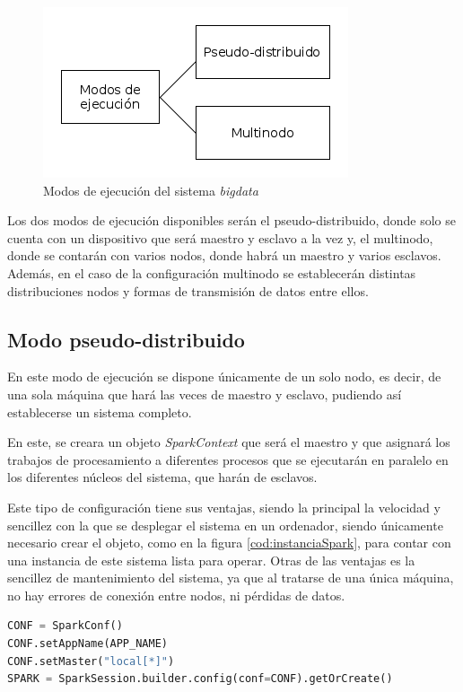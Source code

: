 \begin{figure}[htp!]
\centering
\caption{Modos de ejecución del sistema \textit{bigdata}}
\label{fig:modoEjecución}
\includegraphics[scale=0.6]{diagramas/modoExec}
\end{figure}

Los dos modos de ejecución disponibles serán el pseudo-distribuido, donde solo se cuenta con un dispositivo que será maestro y esclavo a la vez y, el multinodo, donde se contarán con varios nodos, donde habrá un maestro y varios esclavos. Además, en el caso de la configuración multinodo se establecerán distintas distribuciones nodos y formas de transmisión de datos entre ellos.

\subsection{Modo pseudo-distribuido \label{disStandalone}}
En este modo de ejecución se dispone únicamente de un solo nodo, es decir, de una sola máquina que hará las veces de maestro y esclavo, pudiendo así establecerse un sistema completo. 

En este, se creara un objeto \textit{SparkContext} que será el maestro y que asignará los trabajos de procesamiento a diferentes procesos que se ejecutarán en paralelo en los diferentes núcleos del sistema, que harán de esclavos.

Este tipo de configuración tiene sus ventajas, siendo la principal la velocidad y sencillez con la que se desplegar el sistema en un ordenador, siendo únicamente necesario crear el objeto, como en la figura \ref{cod:instanciaSpark}, para contar con una instancia de este sistema lista para operar. Otras de las ventajas es la sencillez de mantenimiento del sistema, ya que al tratarse de una única máquina, no hay errores de conexión entre nodos, ni pérdidas de datos. 

\begin{lstlisting}[label=cod:instanciaSpark,language=Python,frame=single,caption=Modo pseudo-distribuido: Creación instancia de Spark]
CONF = SparkConf()
CONF.setAppName(APP_NAME)
CONF.setMaster("local[*]")
SPARK = SparkSession.builder.config(conf=CONF).getOrCreate()
\end{lstlisting}

